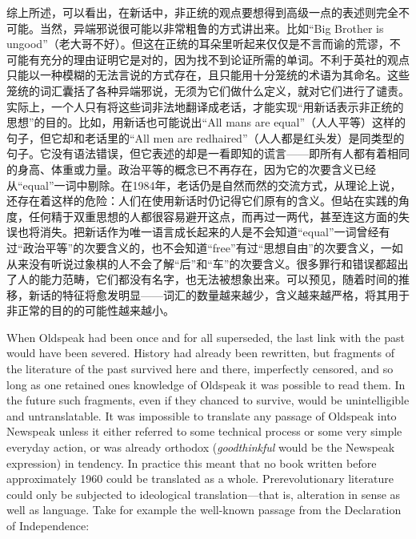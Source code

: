 \begin{paracol}{2}
综上所述，可以看出，在新话中，非正统的观点要想得到高级一点的表述则完全不可能。当然，异端邪说很可能以非常粗鲁的方式讲出来。比如``Big
Brother is
ungood''（老大哥不好）。但这在正统的耳朵里听起来仅仅是不言而谕的荒谬，不可能有充分的理由证明它是对的，因为找不到论证所需的单词。不利于英社的观点只能以一种模糊的无法言说的方式存在，且只能用十分笼统的术语为其命名。这些笼统的词汇囊括了各种异端邪说，无须为它们做什么定义，就对它们进行了谴责。实际上，一个人只有将这些词非法地翻译成老话，才能实现``用新话表示非正统的思想''的目的。比如，用新话也可能说出``All
mans are equal''（人人平等）这样的句子，但它却和老话里的``All men are
redhaired''（人人都是红头发）是同类型的句子。它没有语法错误，但它表述的却是一看即知的谎言——即所有人都有着相同的身高、体重或力量。政治平等的概念已不再存在，因为它的次要含义已经从``equal''一词中剔除。在1984年，老话仍是自然而然的交流方式，从理论上说，还存在着这样的危险：人们在使用新话时仍记得它们原有的含义。但站在实践的角度，任何精于双重思想的人都很容易避开这点，而再过一两代，甚至连这方面的失误也将消失。把新话作为唯一语言成长起来的人是不会知道``equal''一词曾经有过``政治平等''的次要含义的，也不会知道``free''有过``思想自由''的次要含义，一如从来没有听说过象棋的人不会了解``后''和``车''的次要含义。很多罪行和错误都超出了人的能力范畴，它们都没有名字，也无法被想象出来。可以预见，随着时间的推移，新话的特征将愈发明显——词汇的数量越来越少，含义越来越严格，将其用于非正常的目的的可能性越来越小。

\switchcolumn*

When Oldspeak had been once and for all superseded, the last link with
the past would have been severed. History had already been rewritten,
but fragments of the literature of the past survived here and there,
imperfectly censored, and so long as one retained one\textquotesingle s
knowledge of Oldspeak it was possible to read them. In the future such
fragments, even if they chanced to survive, would be unintelligible and
untranslatable. It was impossible to translate any passage of Oldspeak
into Newspeak unless it either referred to some technical process or
some very simple everyday action, or was already orthodox
(\emph{goodthinkful} would be the Newspeak expression) in tendency. In
practice this meant that no book written before approximately 1960 could
be translated as a whole. Prerevolutionary literature could only be
subjected to ideological translation---that is, alteration in sense as
well as language. Take for example the well-known passage from the
Declaration of Independence:

\switchcolumn


\end{paracol}
